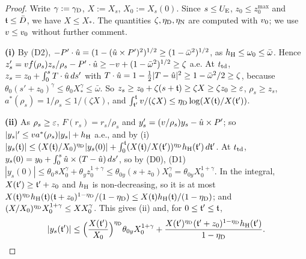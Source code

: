 \begin{proof}
Write $\gamma:=\gamma_{\mathrm D}$, $X:=X_s$, $X_0:=X_s(0)$. Since $s\le U_{\mathrm E}$, $z_0\le z_0^{\max}$ and $\mathfrak t\le\bar D$, we have $X\le X_*$. The
quantities $\zeta,\eta_{\mathrm D},\eta_{\mathrm N}$ are computed with $v_0$; we use $v\le v_0$ without further comment.

\textbf{(i)} By (D2), $-P'\cdot\hat u=(1-(\hat u\times P')^2)^{1/2}\ge(1-\bar\omega^2)^{1/2}$, as $h_{\mathrm H}\le\omega_0\le\bar\omega$. Hence
$z_s'=vf(\rho_s)z_s/\rho_s-P'\cdot\hat u\ge-v+(1-\bar\omega^2)^{1/2}\ge\zeta$ a.e. At $t_{\mathrm{td}}$,
$z_s=z_0+\int_0^sT\cdot\hat u\,ds'$ with $T\cdot\hat u=1-\frac12|T-\hat u|^2\ge1-\bar\omega^2/2\ge\zeta$, because
$\theta_0(s'+z_0)^\gamma\le\theta_0X_*^\gamma\le\bar\omega$. So $z_s\ge z_0+\zeta(s+\mathfrak t)\ge\zeta X\ge\zeta z_0\ge\varepsilon$, $\rho_s\ge z_s$,
$a^*(\rho_s)=1/\rho_s\le1/(\zeta X)$, and $\int_{\mathfrak t'}^{\mathfrak t}v/(\zeta X)\le\eta_{\mathrm D}\log(X(\mathfrak t)/X(\mathfrak t'))$.

\textbf{(ii)} As $\rho_s\ge\varepsilon$, $F(r_s)=r_s/\rho_s$ and $y_s'=(v/\rho_s)y_s-\hat u\times P'$; so $|y_s|'\le va^*(\rho_s)|y_s|+h_{\mathrm H}$ a.e.,
and by (i)
$|y_s(\mathfrak t)|\le(X(\mathfrak t)/X_0)^{\eta_{\mathrm D}}|y_s(0)|+\int_0^{\mathfrak t}(X(\mathfrak t)/X(\mathfrak t'))^{\eta_{\mathrm D}}h_{\mathrm H}(\mathfrak t')\,d\mathfrak t'$. At $t_{\mathrm{td}}$,
$y_s(0)=y_0+\int_0^s\hat u\times(T-\hat u)\,ds'$, so by (D0), (D1)
$|y_s(0)|\le\theta_0sX_0^\gamma+\theta_yz_0^{1+\gamma}\le\theta_{0y}(s+z_0)X_0^\gamma=\theta_{0y}X_0^{1+\gamma}$. In the integral, $X(\mathfrak t')\ge\mathfrak t'+z_0$ and $h_{\mathrm H}$ is
non-decreasing, so it is at most $X(\mathfrak t)^{\eta_{\mathrm D}}h_{\mathrm H}(\mathfrak t)(\mathfrak t+z_0)^{1-\eta_{\mathrm D}}/(1-\eta_{\mathrm D})\le X(\mathfrak t)h_{\mathrm H}(\mathfrak t)/(1-\eta_{\mathrm D})$; and
$(X/X_0)^{\eta_{\mathrm D}}X_0^{1+\gamma}\le XX_0^\gamma$. This gives (ii) and, for $0\le\mathfrak t'\le\mathfrak t$,
\begin{equation}\label{eq:dep-y}
|y_s(\mathfrak t')|\le\Bigl(\frac{X(\mathfrak t')}{X_0}\Bigr)^{\eta_{\mathrm D}}\theta_{0y}X_0^{1+\gamma}
+\frac{X(\mathfrak t')^{\eta_{\mathrm D}}(\mathfrak t'+z_0)^{1-\eta_{\mathrm D}}h_{\mathrm H}(\mathfrak t')}{1-\eta_{\mathrm D}}.
\end{equation}


\end{proof}
